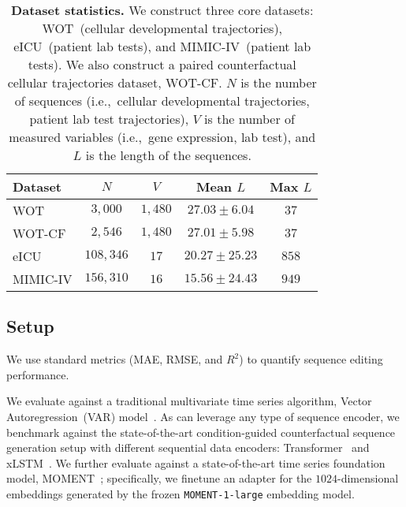 \begin{table}[ht]
\caption{\textbf{Dataset statistics.} We construct three core datasets: WOT~(cellular developmental trajectories), eICU~(patient lab tests), and MIMIC-IV~(patient lab tests). We also construct a paired counterfactual cellular trajectories dataset, WOT-CF. $N$ is the number of sequences (i.e.,~cellular developmental trajectories, patient lab test trajectories), $V$ is the number of measured variables (i.e.,~gene expression, lab test), and $L$ is the length of the sequences.}
\label{tab:data}
\vskip 0.15in
\begin{center}
\begin{small}
\begin{tabular}
{lcccc}
\toprule
\textbf{Dataset}  & $N$ & $V$ & \textbf{Mean $L$} & \textbf{Max $L$} \\
\midrule
WOT      & $3,000$ & $1,480$ & $27.03 \pm 6.04$ & $37$ \\
WOT-CF   & $2,546$ & $1,480$ & $27.01 \pm 5.98$ & $37$ \\
eICU     & $108,346$ & $17$ & $20.27 \pm 25.23$ & $858$ \\
MIMIC-IV & $156,310$ & $16$ & $15.56 \pm 24.43$ & $949$ \\
\bottomrule
\end{tabular}
\end{small}
\end{center}
\vskip -0.15in
\end{table}




\subsection{Setup}


%
We use standard metrics (MAE, RMSE, and $R^2$) to quantify sequence editing performance.

%
We evaluate \name against a traditional multivariate time series algorithm, Vector Autoregression~(VAR) model~\cite{lutkepohl2005new}. As \name can leverage any type of sequence encoder, we benchmark against the state-of-the-art condition-guided counterfactual sequence generation setup with different sequential data encoders: Transformer~\cite{vaswani2017attention, narasimhan2024time, jing2024towards, zhang2023survey} and xLSTM~\cite{beck2024xlstm}. We further evaluate \name against a state-of-the-art time series foundation model, MOMENT~\cite{goswami2024moment}; specifically, we finetune an adapter for the $1024$-dimensional embeddings generated by the frozen \texttt{MOMENT-1-large} embedding model. 


